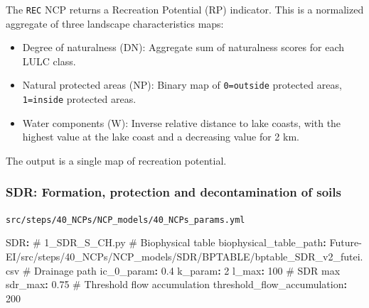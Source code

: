 \documentclass[
  letterpaper,
  DIV=11,
  numbers=noendperiod]{scrreprt}
\newenvironment{Shaded}{\begin{snugshade}}{\end{snugshade}}
\newcommand{\AttributeTok}[1]{\textcolor[rgb]{0.40,0.45,0.13}{#1}}
\newcommand{\CommentTok}[1]{\textcolor[rgb]{0.37,0.37,0.37}{#1}}
\newcommand{\DecValTok}[1]{\textcolor[rgb]{0.68,0.00,0.00}{#1}}
\newcommand{\FloatTok}[1]{\textcolor[rgb]{0.68,0.00,0.00}{#1}}
\newcommand{\FunctionTok}[1]{\textcolor[rgb]{0.28,0.35,0.67}{#1}}
\newcommand{\KeywordTok}[1]{\textcolor[rgb]{0.00,0.23,0.31}{\textbf{#1}}}
\providecommand{\tightlist}{%
  \setlength{\itemsep}{0pt}\setlength{\parskip}{0pt}}\usepackage{longtable,booktabs,array}
\begin{document}
The \texttt{REC} NCP returns a Recreation Potential (RP) indicator. This
is a normalized aggregate of three landscape characteristics maps:

\begin{itemize}
\tightlist
\item
  Degree of naturalness (DN): Aggregate sum of naturalness scores for
  each LULC class.
\item
  Natural protected areas (NP): Binary map of \texttt{0=outside}
  protected areas, \texttt{1=inside} protected areas.
\item
  Water components (W): Inverse relative distance to lake coasts, with
  the highest value at the lake coast and a decreasing value for 2 km.
\end{itemize}

The output is a single map of recreation potential.

\subsubsection{SDR: Formation, protection and decontamination of
soils}\label{SDR}

\begin{codelisting}

\caption{\texttt{src/steps/40\_NCPs/NCP\_models/40\_NCPs\_params.yml}}

\begin{Shaded}
\begin{Highlighting}[]
\FunctionTok{SDR}\KeywordTok{:}
\CommentTok{  \# 1\_SDR\_S\_CH.py}
\CommentTok{  \# Biophysical table}
\AttributeTok{  }\FunctionTok{biophysical\_table\_path}\KeywordTok{:}
\AttributeTok{    Future{-}EI/src/steps/40\_NCPs/NCP\_models/SDR/BPTABLE/bptable\_SDR\_v2\_futei.csv}
\CommentTok{  \# Drainage path}
\AttributeTok{  }\FunctionTok{ic\_0\_param}\KeywordTok{:}\AttributeTok{ }\FloatTok{0.4}
\AttributeTok{  }\FunctionTok{k\_param}\KeywordTok{:}\AttributeTok{ }\DecValTok{2}
\AttributeTok{  }\FunctionTok{l\_max}\KeywordTok{:}\AttributeTok{ }\DecValTok{100}
\CommentTok{  \# SDR max}
\AttributeTok{  }\FunctionTok{sdr\_max}\KeywordTok{:}\AttributeTok{ }\FloatTok{0.75}
\CommentTok{  \# Threshold flow accumulation}
\AttributeTok{  }\FunctionTok{threshold\_flow\_accumulation}\KeywordTok{:}\AttributeTok{ }\DecValTok{200}
\end{Highlighting}
\end{Shaded}

\end{codelisting}
\end{document}
